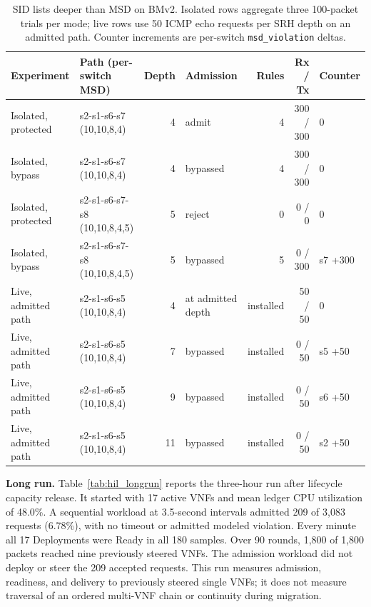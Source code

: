 \documentclass[final,5p]{elsarticle}
\newcommand{\rev}[1]{\textcolor{revisiongreen}{#1}}
\let\newrev\rev
\begin{document}
\begin{table}[t]
\centering
\caption{\newrev{SID lists deeper than MSD on BMv2. Isolated rows aggregate three 100-packet trials per mode; live rows use 50 ICMP echo requests per SRH depth on an admitted path. Counter increments are per-switch \texttt{msd\_violation} deltas.}}
\label{tab:hil_msd}
{\color{revisiongreen}
\small
\begin{tabular}{@{}llrlrrl@{}}
\toprule
Experiment & Path (per-switch MSD) & Depth & Admission & Rules & Rx / Tx & Counter \\
\midrule
Isolated, protected & s2-s1-s6-s7 (10,10,8,4) & 4 & admit & 4 & 300 / 300 & 0 \\
Isolated, bypass & s2-s1-s6-s7 (10,10,8,4) & 4 & bypassed & 4 & 300 / 300 & 0 \\
Isolated, protected & s2-s1-s6-s7-s8 (10,10,8,4,5) & 5 & reject & 0 & 0 / 0 & 0 \\
Isolated, bypass & s2-s1-s6-s7-s8 (10,10,8,4,5) & 5 & bypassed & 5 & 0 / 300 & s7 +300 \\
\midrule
Live, admitted path & s2-s1-s6-s5 (10,10,8,4) & 4 & at admitted depth & installed & 50 / 50 & 0 \\
Live, admitted path & s2-s1-s6-s5 (10,10,8,4) & 7 & bypassed & installed & 0 / 50 & s5 +50 \\
Live, admitted path & s2-s1-s6-s5 (10,10,8,4) & 9 & bypassed & installed & 0 / 50 & s6 +50 \\
Live, admitted path & s2-s1-s6-s5 (10,10,8,4) & 11 & bypassed & installed & 0 / 50 & s2 +50 \\
\bottomrule
\end{tabular}
}
\end{table}

\newrev{\textbf{Long run.} Table~\ref{tab:hil_longrun} reports the three-hour run after lifecycle capacity release. It started with 17 active VNFs and mean ledger CPU utilization of 48.0\%. A sequential workload at 3.5-second intervals admitted 209 of 3,083 requests (6.78\%), with no timeout or admitted modeled violation. Every minute all 17 Deployments were Ready in all 180 samples. Over 90 rounds, 1,800 of 1,800 packets reached nine previously steered VNFs. The admission workload did not deploy or steer the 209 accepted requests. This run measures admission, readiness, and delivery to previously steered single VNFs; it does not measure traversal of an ordered multi-VNF chain or continuity during migration.}
\end{document}
